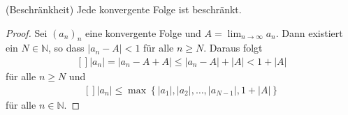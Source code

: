 \documentclass[../Analysis1_script.tex]{subfiles}
\begin{document}
\begin{lemma}{(Beschränkheit)}
	Jede konvergente Folge ist beschränkt. 
\end{lemma}

\begin{proof}
	Sei $(a_n)_{n}$ eine konvergente Folge und $A = \lim _{n\to \infty }a_n$. Dann existiert ein $N \in \mathbb {N}$, so dass $|a_n-A|<1$ für alle $n \geq N$. Daraus folgt
	\[\begin{aligned}[]
		|a_n| = |a_n - A+A| \leq |a_n-A|+|A| <1+|A|
	\end{aligned}\]
	für alle $n \geq N$ und
	\[\begin{aligned}[]
		|a_n| \leq \max \left \lbrace {|a_1|,|a_2|,\ldots ,|a_{N-1}|,1+|A|} \right \rbrace
	\end{aligned}\]
	für alle $n \in \mathbb {N}$.
\end{proof}
 
\end{document}
